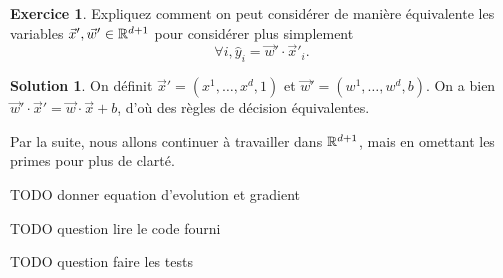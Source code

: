 \documentclass[a4paper,francais]{article}
\newcommand{\R}{{\ensuremath\mathbb{R}}}
\theoremstyle{definition}
\newtheorem{exercice}{Exercice}[section]
\newtheorem*{solution}{Solution}
\begin{document}
\begin{exercice}
  Expliquez comment on peut considérer de manière équivalente
  les variables $\vec{x}', \vec{w}' \in \R^{d+1}$ pour considérer
  plus simplement
  \[ \forall i, \hat{y}_i = \vec{w}' \cdot \vec{x}'_i. \]
\end{exercice}

\begin{solution}
  On définit $\vec{x}' = (x^1, \dots, x^d, 1)$ et
  $\vec{w}' = (w^1, \dots, w^d, b)$. On a bien
  $\vec{w}'\cdot\vec{x}' = \vec{w}\cdot\vec{x} + b$,
  d'où des règles de décision équivalentes. 
\end{solution}

Par la suite, nous allons continuer à travailler dans $\R^{d+1}$,
mais en omettant les primes pour plus de clarté. 

TODO donner equation d'evolution et gradient

TODO question lire le code fourni

TODO question faire les tests
\end{document}

